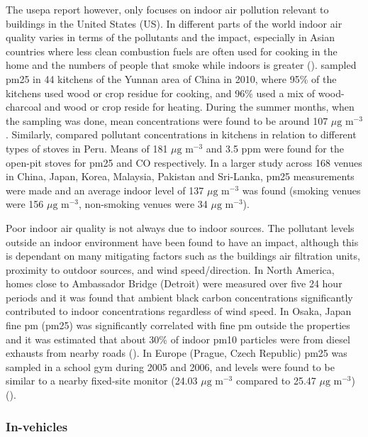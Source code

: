 The \gls{usepa} report however, only focuses on indoor air pollution relevant to buildings in the United States (US). In different parts of the world indoor air quality varies in terms of the pollutants and the impact, especially in Asian countries where less clean combustion fuels are often used for cooking in the home and the numbers of people that smoke while indoors is greater (\cite{Lee2010}). 
\cite{Baumgartner2011} sampled \gls{pm25} in 44 kitchens of the Yunnan area of China in 2010, where 95\% of the kitchens used wood or crop residue for cooking, and 96\% used a mix of wood-charcoal and wood or crop reside for heating. During the summer months, when the sampling was done, mean concentrations were found to be around 107 $\mu \text{g m}^{-3}$. Similarly, \cite{Li2011} compared pollutant concentrations in kitchens in relation to different types of stoves in Peru. Means of 181 $\mu \text{g m}^{-3}$ and 3.5 ppm were found for the open-pit stoves for \gls{pm25} and CO respectively. In a larger study across 168 venues in China, Japan, Korea, Malaysia, Pakistan and Sri-Lanka, \gls{pm25} measurements were made and an average indoor level of 137 $\mu \text{g m}^{-3}$ was found (smoking venues were 156 $\mu \text{g m}^{-3}$, non-smoking venues were 34 $\mu \text{g m}^{-3}$).

Poor indoor air quality is not always due to indoor sources. The pollutant levels outside an indoor environment have been found to have an impact, although this is dependant on many mitigating factors such as the buildings air filtration units, proximity to outdoor sources, and wind speed/direction. In North America, homes close to Ambassador Bridge (Detroit) were measured over five 24 hour periods \cite{Baxter2008} and it was found that ambient black carbon concentrations significantly contributed to indoor concentrations regardless of wind speed. In Osaka, Japan fine \gls{pm} (\gls{pm25}) was significantly correlated with fine \gls{pm} outside the properties and it was estimated that about 30\% of indoor \gls{pm10} particles were from diesel exhausts from nearby roads (\cite{Funasaka2000}). In Europe (Prague, Czech Republic) \gls{pm25} was sampled in a school gym during 2005 and 2006, and levels were found to be similar to a nearby fixed-site monitor (24.03 $\mu \text{g m}^{-3}$ compared to 25.47 $\mu \text{g m}^{-3}$) (\cite{Branis2009}).

\subsubsection{In-vehicles}
\label{subsubsec:invehicle}

